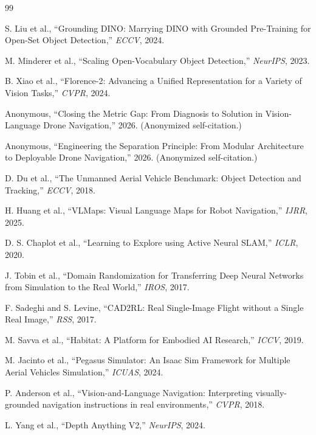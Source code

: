 \documentclass[conference]{IEEEtran}
\begin{document}

\begin{thebibliography}{99}

S. Liu et al., ``Grounding DINO: Marrying DINO with Grounded Pre-Training for Open-Set Object Detection,'' \textit{ECCV}, 2024.

M. Minderer et al., ``Scaling Open-Vocabulary Object Detection,'' \textit{NeurIPS}, 2023.

B. Xiao et al., ``Florence-2: Advancing a Unified Representation for a Variety of Vision Tasks,'' \textit{CVPR}, 2024.

Anonymous, ``Closing the Metric Gap: From Diagnosis to Solution in Vision-Language Drone Navigation,'' 2026. (Anonymized self-citation.)

Anonymous, ``Engineering the Separation Principle: From Modular Architecture to Deployable Drone Navigation,'' 2026. (Anonymized self-citation.)

D. Du et al., ``The Unmanned Aerial Vehicle Benchmark: Object Detection and Tracking,'' \textit{ECCV}, 2018.

H. Huang et al., ``VLMaps: Visual Language Maps for Robot Navigation,'' \textit{IJRR}, 2025.

D. S. Chaplot et al., ``Learning to Explore using Active Neural SLAM,'' \textit{ICLR}, 2020.

J. Tobin et al., ``Domain Randomization for Transferring Deep Neural Networks from Simulation to the Real World,'' \textit{IROS}, 2017.

F. Sadeghi and S. Levine, ``CAD2RL: Real Single-Image Flight without a Single Real Image,'' \textit{RSS}, 2017.

M. Savva et al., ``Habitat: A Platform for Embodied AI Research,'' \textit{ICCV}, 2019.

M. Jacinto et al., ``Pegasus Simulator: An Isaac Sim Framework for Multiple Aerial Vehicles Simulation,'' \textit{ICUAS}, 2024.

P. Anderson et al., ``Vision-and-Language Navigation: Interpreting visually-grounded navigation instructions in real environments,'' \textit{CVPR}, 2018.

L. Yang et al., ``Depth Anything V2,'' \textit{NeurIPS}, 2024.

\end{thebibliography}
\end{document}
